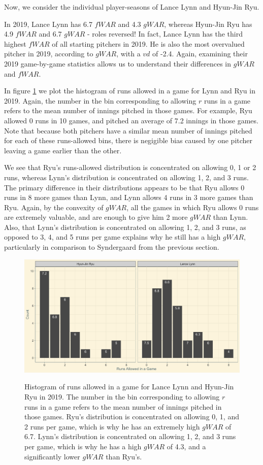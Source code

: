\documentclass[12pt]{article}
\begin{document}
Now, we consider the individual player-seasons of Lance Lynn and Hyun-Jin Ryu.

In 2019, Lance Lynn has 6.7 $fWAR$ and 4.3 $gWAR$, whereas Hyun-Jin Ryu has 4.9 $fWAR$ and 6.7 $gWAR$ - roles reversed! In fact, Lance Lynn has the third highest $fWAR$ of all starting pitchers in 2019. He is also the most overvalued pitcher in 2019, according to $gWAR$, with a $vd$ of -2.4. Again, examining their 2019 game-by-game statistics allows us to understand their differences in $gWAR$ and $fWAR$.

In figure \ref{fig:cumRunsLynnRyu} we plot the histogram of runs allowed in a game for Lynn and Ryu in 2019. Again, the number in the bin corresponding to allowing $r$ runs in a game refers to the mean number of innings pitched in those games. For example, Ryu allowed 0 runs in 10 games, and pitched an average of 7.2 innings in those games. Note that because both pitchers have a similar mean number of innings pitched for each of these runs-allowed bins, there is negigible bias caused by one pitcher leaving a game earlier than the other. 

We see that Ryu's runs-allowed distribution is concentrated on allowing 0, 1 or 2 runs, whereas Lynn's distribution is concentrated on allowing 1, 2, and 3 runs. The primary difference in their distributions appears to be that Ryu allows 0 runs in 8 more games than Lynn, and Lynn allows 4 runs in 3 more games than Ryu. Again, by the convexity of $gWAR$, all the games in which Ryu allows 0 runs are extremely valuable, and are enough to give him 2 more $gWAR$ than Lynn. Also, that Lynn's distribution is concentrated on allowing 1, 2, and 3 runs, as opposed to 3, 4, and 5 runs per game explains why he still has a high $gWAR$, particularly in comparison to Syndergaard from the previous section.

\begin{figure}[t!]
\centering
\caption{Histogram of runs allowed in a game for Lance Lynn and Hyun-Jin Ryu in 2019. The number in the bin corresponding to allowing $r$ runs in a game refers to the mean number of innings pitched in those games. Ryu's distribution is concentrated on allowing 0, 1, and 2 runs per game, which is why he has an extremely high $gWAR$ of 6.7. Lynn's distribution is concentrated on allowing 1, 2, and 3 runs per game, which is why he has a high $gWAR$ of 4.3, and a significantly lower $gWAR$ than Ryu's.} 
\includegraphics[width=15cm]{../writeup_plots/plot_Lynn_Ryu_2019.png}
\label{fig:cumRunsLynnRyu}
\end{figure}
\end{document}
